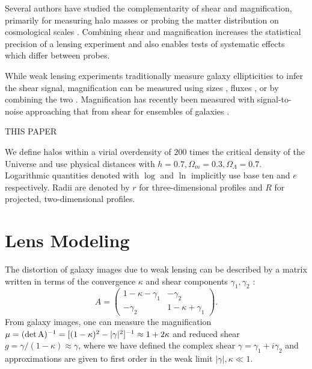 \documentclass[12pt]{emulateapj}
\begin{document}
Several authors have studied the complementarity of shear and
magnification, primarily for measuring halo masses
\citep{Bartelmann1996, Bridle1998, Schneider2000, vanWaerbeke2010b,
  Rozo2010, Umetsu2011} or probing the matter distribution on
cosmological scales \citep{vanWaerbeke2010a, Casaponsa2013,
  Duncan2013, Krause2013}. Combining shear and magnification increases
the statistical precision of a lensing experiment and also enables
tests of systematic effects which differ between probes.

While weak lensing experiments traditionally measure galaxy
ellipticities to infer the shear signal, magnification can be measured
using sizes \citep{Bartelmann1995}, fluxes \citep{Broadhurst1995}, or
by combining the two \citep{Huff2011, Schmidt2012}. Magnification has
recently been measured with signal-to-noise approaching that from
shear for ensembles of galaxies \citep{Scranton2005, Hildebrandt2009,
  Menard2010, Huff2011, Ford2012, Schmidt2012}.

THIS PAPER

We define halos within a virial overdensity of $200$ times the
critical density of the Universe and use physical distances with
$h=0.7, \Omega_m=0.3, \Omega_\Lambda=0.7$. Logarithmic quantities
denoted with $\log$ and $\ln$ implicitly use base ten and $e$
respectively. Radii are denoted by $r$ for three-dimensional profiles
and $R$ for projected, two-dimensional profiles.

\section{Lens Modeling}
\label{sec:model}

The distortion of galaxy images due to weak lensing can be described
by a matrix written in terms of the convergence $\kappa$ and shear
components $\gamma_1, \gamma_2$ \citep[e.g.][]{Bartelmann2001}:
\begin{equation}
A = \left( \begin{array}{cc}
1 - \kappa -\gamma_1 & -\gamma_2 \\
-\gamma_2 & 1 - \kappa + \gamma_1 \end{array} \right).
\end{equation}
From galaxy images, one can measure the magnification 
$\mu = (\rm{det}\,A)^{-1} = [(1-\kappa)^2 - |\gamma|^2]^{-1} \approx 1+2\kappa$
and reduced shear $g = \gamma / (1-\kappa) \approx \gamma$, where we have defined the
complex shear $\gamma=\gamma_1 + i\gamma_2$ and approximations are
given to first order in the weak limit $|\gamma|,\kappa \ll 1$.
\end{document}
